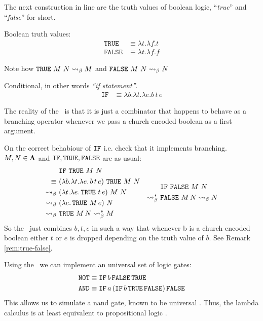 \documentclass[12pt]{book}
\begin{document}
The next construction in line are the truth values of boolean logic, ``\textit{true}'' and ``\textit{false}'' for short.
\begin{definition} Boolean truth values:
  \begin{align*}
    \texttt{TRUE} &\equiv \lambda t.\lambda f. t \\
    \texttt{FALSE} &\equiv \lambda t.\lambda f. f
  \end{align*}
\end{definition}
\begin{remark}
  \label{rem:true-false}
  Note how $\texttt{TRUE} \ M \ N \mathrel{\leadsto}_\beta M $ and $ \texttt{FALSE} \ M \ N \mathrel{\leadsto}_\beta N $
\end{remark}
\begin{definition} Conditional, in other words \textit{``if statement''}.
  \begin{align*}
    \texttt{IF} &\equiv \lambda b.\lambda t.\lambda e. b\,t\,e
  \end{align*}
\end{definition}
The reality of the \IF \ is that it is just a combinator that happens to behave as a branching operator whenever we pass a church encoded boolean as a first argument.
\begin{example} On the correct behabiour of $\texttt{IF}$ i.e. check that it implements branching. $ M, N \in \mathbf{\Lambda} $ and $ \texttt{IF}, \texttt{TRUE}, \texttt{FALSE}$ are as usual:
  \[
    \begin{aligned}
      & \IF \ \TRUE \ M \ N \\
      \equiv \ & (\la b.\la t.\la e.\, b\, t\, e) \ \TRUE \ M \ N  \\
      \curly \ & (\la t.\la e.\, \TRUE\ t\, e) \ M \ N  \\
      \curly \ & (\la e.\, \TRUE\ M\, e) \ N  \\
      \curly \ & \TRUE\ M\, N \curly^* M 
    \end{aligned}
    \quad
    \begin{aligned}
      & \IF \ \FALSE \ M \ N \\
      \curly^* \ & \FALSE\ M\, N \curly N
    \end{aligned}
  \]
  So the \IF \ just combines $b, t, e$ in such a way that whenever b is a church encoded boolean either $t$ or $e$ is dropped depending on the truth value of $b$. See Remark \ref{rem:true-false}.
\end{example}
\begin{remark}
  Using the \IF \ we can implement an universal set of logic gates:
  \begin{align*}
    \texttt{NOT} &\equiv \texttt{IF} \, b \, \texttt{FALSE} \, \texttt{TRUE} \\
    \texttt{AND} &\equiv \texttt{IF} \, a \, (\texttt{IF} \, b \, \texttt{TRUE} \, \texttt{FALSE}) \, \texttt{FALSE}
  \end{align*}
  This allows us to simulate a nand gate, known to be universal . Thus, the lambda calculus is at least equivalent to propositional logic .
\end{remark}
\end{document}
